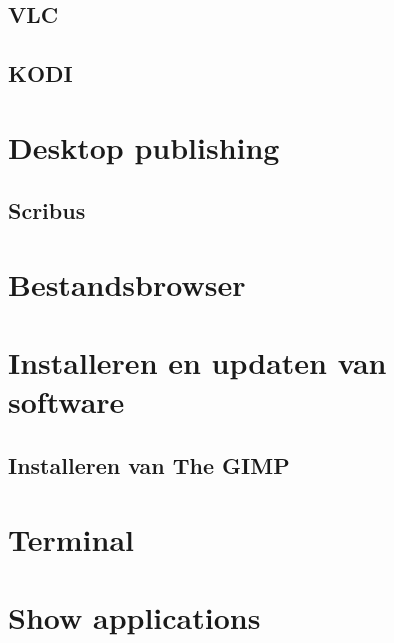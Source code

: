\documentclass[a4paper,12pt,twoside,openright,titlepage]{book}
\begin{document}
\subsection{VLC}
\subsection{KODI}
\section{Desktop publishing}
\subsection{Scribus}

\section{Bestandsbrowser}
\section{Installeren en updaten van software}
\subsection{Installeren van The GIMP}

\section{Terminal}

\section{Show applications}


\backmatter
\printindex
\end{document}
